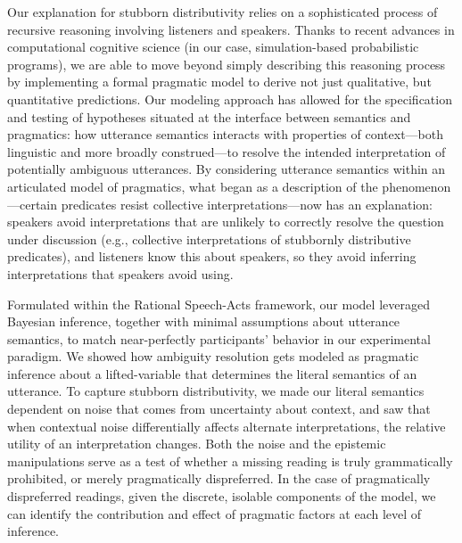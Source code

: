 \documentclass[linguex]{sp}
\newcommand{\ndg}[1]{\textcolor{Green}{[ndg: #1]}}
\begin{document}

Our explanation for stubborn distributivity relies on a sophisticated process of recursive reasoning involving listeners and speakers. 
Thanks to recent advances in computational cognitive science (in our case, simulation-based probabilistic programs), we are able to move beyond simply describing this reasoning process by implementing a formal pragmatic model to derive not just qualitative, but quantitative predictions. Our modeling approach has allowed for the specification and testing of hypotheses situated at the interface between semantics and pragmatics: how utterance semantics interacts with properties of context---both linguistic and more broadly construed---to resolve the intended interpretation of potentially ambiguous utterances. 
By considering utterance semantics within an articulated model of pragmatics, what began as a description of the phenomenon---certain predicates resist collective interpretations---now has an explanation: speakers avoid interpretations that are unlikely to correctly resolve the question under discussion (e.g., collective interpretations of stubbornly distributive predicates), and listeners know this about speakers, so they avoid inferring interpretations that speakers avoid using.

Formulated within the Rational Speech-Acts framework, our model leveraged Bayesian inference, together with minimal assumptions about utterance semantics, to match near-perfectly participants' behavior in our experimental paradigm. We showed how ambiguity resolution gets modeled as pragmatic inference about a lifted-variable that determines the literal semantics of an utterance. To capture stubborn distributivity, we made our literal semantics dependent on noise that comes from uncertainty about context, and saw that when contextual noise differentially affects alternate interpretations, the relative utility of an interpretation changes. Both the noise and the epistemic manipulations serve as a test of whether a missing reading is truly grammatically prohibited, or merely pragmatically dispreferred. In the case of pragmatically dispreferred readings, given the discrete, isolable components of the model, we can identify the contribution and effect of pragmatic factors at each level of inference.
\end{document}
